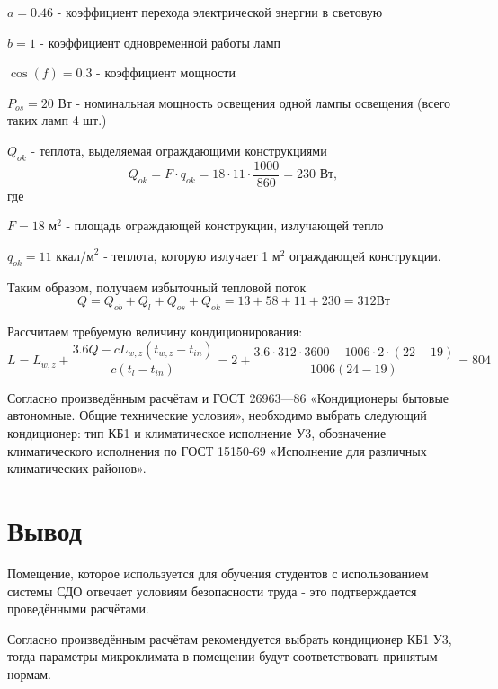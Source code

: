 $a = 0.46$ - коэффициент перехода электрической энергии в световую

$b = 1$ -  коэффициент одновременной работы ламп

$\cos(f) = 0.3$ - коэффициент мощности

$P_{os} = 20 \mbox{ Вт}$ -  номинальная мощность освещения одной лампы освещения
(всего таких ламп 4 шт.)

$Q_{ok}$ - теплота, выделяемая ограждающими конструкциями
$$
Q_{ok} = F\cdot q_{ok} = 18 \cdot 11 \cdot \frac{1000}{860} = 230 \mbox{ Вт},
$$
где

$F = 18 \mbox{ м}^2$  - площадь ограждающей конструкции, излучающей тепло

$q_{ok} = 11 \mbox{ ккал/м}^2$ -  теплота, которую излучает 1 м$^2$ ограждающей конструкции.

Таким образом, получаем избыточный тепловой поток
$$
Q = Q_{ob} + Q_{l} + Q_{os} + Q_{ok}= 13 + 58 + 11 + 230 = 312 \mbox{Вт}
$$

Рассчитаем требуемую величину кондиционирования:
$$
L = L_{w,z} + \frac{3.6Q - cL_{w,z}(t_{w,z} - t_{in})}{c(t_{l}-t_{in})} = 2 + \frac{3.6\cdot312\cdot3600 - 1006\cdot2\cdot(22-19)}{1006(24-19)} = 804
$$

Согласно произведённым расчётам и ГОСТ 26963—86 «Кондиционеры бытовые авто\-номные. Общие технические условия», необходимо выбрать следующий кондиционер: тип КБ1 и климатическое исполнение У3, обозначение климатического исполнения по ГОСТ 15150-69 «Исполнение для различных климатических районов».

\section{Вывод}

Помещение, которое используется для обучения студентов с использованием системы СДО отвечает условиям безопасности труда - это подтверждается проведёнными расчётами. 

Согласно произведённым расчётам рекомендуется выбрать кондиционер КБ1 У3, тогда параметры микроклимата в помещении будут соответствовать принятым нормам.


 
